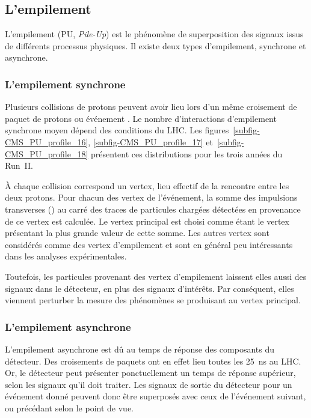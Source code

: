 \subsection{L'empilement}\label{chapter-LHC-section-LHC-subsec-PU}
L'empilement (PU, \emph{Pile-Up}) est le phénomène de superposition des signaux issus de différents processus physiques.
Il existe deux types d'empilement, synchrone et asynchrone.
\subsubsection{L'empilement synchrone}
Plusieurs collisions de protons peuvent avoir lieu lors d'un même  croisement de paquet de protons ou \og événement \fg.
Le nombre d'interactions d'empilement synchrone moyen dépend des conditions du LHC.
Les figures~\ref{subfig-CMS_PU_profile_16}, \ref{subfig-CMS_PU_profile_17} et~\ref{subfig-CMS_PU_profile_18} présentent ces distributions pour les trois années du Run~II.
\par À chaque collision correspond un vertex, lieu effectif de la rencontre entre les deux protons.
Pour chacun des vertex de l'événement, la somme des impulsions transverses (\pT) au carré des traces de particules chargées détectées en provenance de ce vertex est calculée.
Le vertex principal est choisi comme étant le vertex présentant la plus grande valeur de cette somme.
Les autres vertex sont considérés comme des vertex d'empilement et sont en général peu intéressants dans les analyses expérimentales.
\par Toutefois, les particules provenant des vertex d'empilement laissent elles aussi des signaux dans le détecteur, en plus des signaux d'intérêts.
Par conséquent, elles viennent perturber la mesure des phénomènes se produisant au vertex principal.
\subsubsection{L'empilement asynchrone}
L'empilement asynchrone est dû au temps de réponse des composants du détecteur.
Des croisements de paquets ont en effet lieu toutes les \SI{25}{\nano\second} au LHC.
Or, le détecteur peut présenter ponctuellement un temps de réponse supérieur, selon les signaux qu'il doit traiter.
Les signaux de sortie du détecteur pour un événement donné peuvent donc être superposés avec ceux de l'événement suivant, ou précédant selon le point de vue.
